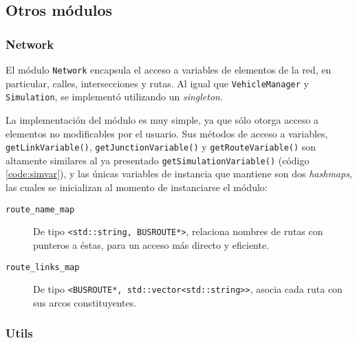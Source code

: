 \subsection{Otros módulos}\label{sec:miscmodules}

\subsubsection{Network}

El módulo \texttt{Network} encapsula el acceso a variables de elementos de la red, en particular, calles, intersecciones y rutas. Al igual que \texttt{VehicleManager} y \texttt{Simulation}, se implementó utilizando un \emph{singleton}. 

La implementación del módulo es muy simple, ya que sólo otorga acceso a elementos no modificables por el usuario. Sus métodos de acceso a variables, \texttt{getLinkVariable()}, \texttt{getJunctionVariable()} y \texttt{getRouteVariable()} son altamente similares al ya presentado \texttt{getSimulationVariable()} (código \ref{code:simvar}), y las únicas variables de instancia que mantiene son dos \emph{hashmaps}, las cuales se inicializan al momento de instanciarse el módulo:
\begin{description}
    \item [\texttt{route\_name\_map}] De tipo \texttt{<std::string, BUSROUTE*>}, relaciona nombres de rutas con punteros a éstas, para un acceso más directo y eficiente.
    
    \item [\texttt{route\_links\_map}] De tipo \texttt{<BUSROUTE*, std::vector<std::string>\@>}, asocia cada ruta con sus arcos constituyentes.
    
\end{description}

\begin{figure}[htpb]
     
\end{figure}


\subsubsection{Utils}

